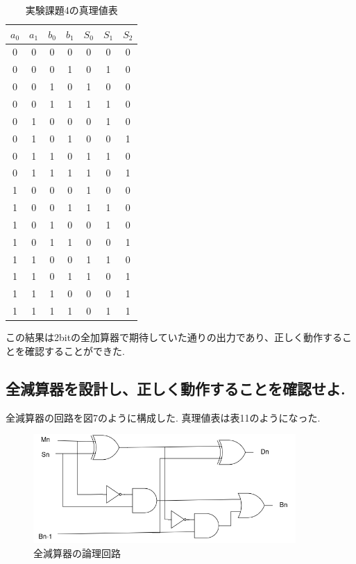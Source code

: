 \documentclass[titlepage]{jsarticle}
\theoremstyle{definition}
\begin{document}
\begin{table}[htbp]
	\caption{実験課題4の真理値表}
	\centering
	\begin{tabular}{|c|c|c|c||c|c|c|} \hline
		$a_0$ & $a_1$ & $b_0$ & $b_1$ & $S_0$ & $S_1$ & $S_2$ \\ \hline \hline
		0 & 0 & 0 & 0 & 0 & 0 & 0 \\ \hline
		0 & 0 & 0 & 1 & 0 & 1 & 0 \\ \hline
		0 & 0 & 1 & 0 & 1 & 0 & 0 \\ \hline
		0 & 0 & 1 & 1 & 1 & 1 & 0 \\ \hline
		0 & 1 & 0 & 0 & 0 & 1 & 0 \\ \hline
		0 & 1 & 0 & 1 & 0 & 0 & 1 \\ \hline
		0 & 1 & 1 & 0 & 1 & 1 & 0 \\ \hline
		0 & 1 & 1 & 1 & 1 & 0 & 1 \\ \hline
		1 & 0 & 0 & 0 & 1 & 0 & 0 \\ \hline
		1 & 0 & 0 & 1 & 1 & 1 & 0 \\ \hline
		1 & 0 & 1 & 0 & 0 & 1 & 0 \\ \hline
		1 & 0 & 1 & 1 & 0 & 0 & 1 \\ \hline
		1 & 1 & 0 & 0 & 1 & 1 & 0 \\ \hline
		1 & 1 & 0 & 1 & 1 & 0 & 1 \\ \hline
		1 & 1 & 1 & 0 & 0 & 0 & 1 \\ \hline
		1 & 1 & 1 & 1 & 0 & 1 & 1 \\ \hline
	\end{tabular}
\end{table}


この結果は2bitの全加算器で期待していた通りの出力であり、正しく動作することを確認することができた.


\subsection{全減算器を設計し、正しく動作することを確認せよ.}
全減算器の回路を図7のように構成した.
真理値表は表11のようになった.

\begin{figure}[htbp]
	\begin{center}
		\includegraphics[width=100mm]{sub.png}
		\caption{全減算器の論理回路}
	\end{center}
\end{figure}
\end{document}
